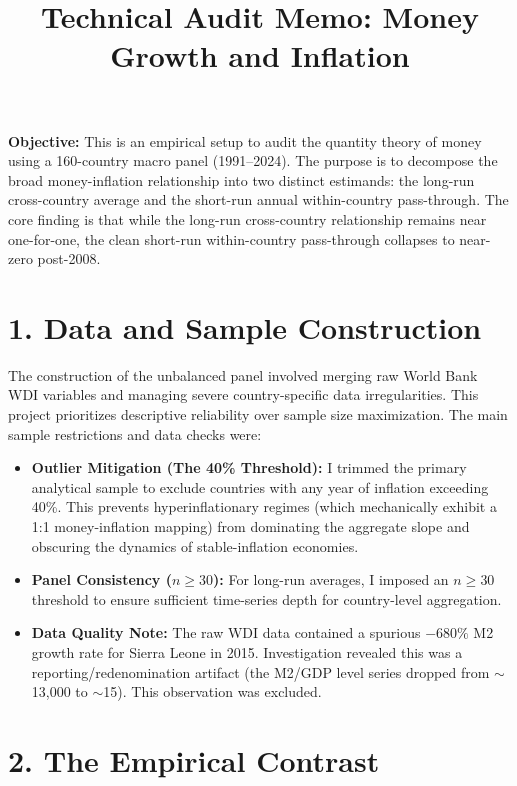 \documentclass[11pt,a4paper]{article}
\title{\textbf{Technical Audit Memo: Money Growth and Inflation}}
\author{}
\date{}
\begin{document}
\maketitle

\textbf{Objective:} This is an empirical setup to audit the quantity theory of money using a 160-country macro panel (1991--2024). The purpose is to decompose the broad money-inflation relationship into two distinct estimands: the long-run cross-country average and the short-run annual within-country pass-through. The core finding is that while the long-run cross-country relationship remains near one-for-one, the clean short-run within-country pass-through collapses to near-zero post-2008.

\section*{1. Data and Sample Construction}

The construction of the unbalanced panel involved merging raw World Bank WDI variables and managing severe country-specific data irregularities. This project prioritizes descriptive reliability over sample size maximization. The main sample restrictions and data checks were:

\begin{itemize}
    \item \textbf{Outlier Mitigation (The 40\% Threshold):} I trimmed the primary analytical sample to exclude countries with any year of inflation exceeding 40\%. This prevents hyperinflationary regimes (which mechanically exhibit a 1:1 money-inflation mapping) from dominating the aggregate slope and obscuring the dynamics of stable-inflation economies.
    \item \textbf{Panel Consistency ($n \ge 30$):} For long-run averages, I imposed an $n \ge 30$ threshold to ensure sufficient time-series depth for country-level aggregation.
    \item \textbf{Data Quality Note:} The raw WDI data contained a spurious $-680\%$ M2 growth rate for Sierra Leone in 2015. Investigation revealed this was a reporting/redenomination artifact (the M2/GDP level series dropped from $\sim$13,000 to $\sim$15). This observation was excluded.
\end{itemize}

\section*{2. The Empirical Contrast}
\end{document}
